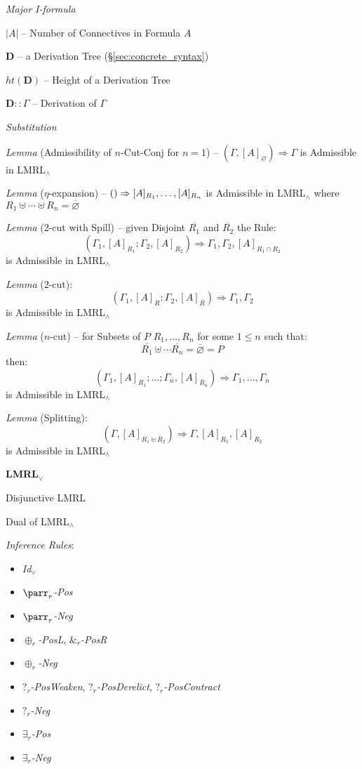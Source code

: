 \emph{Major I-formula} %

$|A|$ -- Number of Connectives in Formula $A$

$\mathbf{D}$ -- a Derivation Tree (\S\ref{sec:concrete_syntax})

$ht(\mathbf{D})$ -- Height of a Derivation Tree

$\mathbf{D} :: \Gamma$ -- Derivation of $\Gamma$

\emph{Substitution} %

\emph{Lemma} (Admissibility of $n$-Cut-Conj for $n = 1$) -- $(\Gamma,
     [A]_\varnothing) \Rightarrow \Gamma$ is Admissible in
     LMRL$_\wedge$

\emph{Lemma} ($\eta$-expansion) -- $\mathsf{()} \Rightarrow [A]_{R_1}, \ldots,
     [A]_{R_n}$ is Admissible in LMRL$_\wedge$ where $R_1 \uplus
     \cdots \uplus R_n = \overline{\varnothing}$

\emph{Lemma} (2-cut with Spill) -- given Disjoint $\overline{R_1}$ and
$\overline{R_2}$ the Rule:
\[
  (\Gamma_1, [A]_{R_1}; \Gamma_2,[A]_{R_2}) \Rightarrow
    \Gamma_1, \Gamma_2, [A]_{R_1 \cap R_2}
\]
is Admissible in LMRL$_\wedge$

\emph{Lemma} (2-cut):
\[
  (\Gamma_1, [A]_R : \Gamma_2, [A]_{\overline{R}})
    \Rightarrow \Gamma_1,\Gamma_2
\]
is Admissible in LMRL$_\wedge$

\emph{Lemma} ($n$-cut) -- for Subsets of $P$ $R_1,\ldots,R_n$ for some
$1 \leq n$ such that:
\[
  \overline{R_1} \uplus \cdots \overline{R_n} = \overline{\varnothing}
    = P
\]
then:
\[
  (\Gamma_1,[A]_{R_1}; \ldots; \Gamma_n,[A]_{R_n})
    \Rightarrow \Gamma_1, \ldots, \Gamma_n
\]
is Admissible in LMRL$_\wedge$

\emph{Lemma} (Splitting):
\[
  (\Gamma,[A]_{R_1 \uplus R_2}) \Rightarrow \Gamma,[A]_{R_1},[A]_{R_2}
\]
is Admissible in LMRL$_\wedge$


\textbf{LMRL$_\vee$}

Disjunctive LMRL

Dual of LMRL$_\wedge$

\emph{Inference Rules}:
\begin{itemize}
  \item \emph{Id$_\vee$}
  \item \emph{$\parr_r$-Pos}
  \item \emph{$\parr_r$-Neg}
  \item \emph{$\oplus_r$-PosL}, \emph{$\&_r$-PosR}
  \item \emph{$\oplus_r$-Neg}
  \item \emph{$?_r$-PosWeaken}, \emph{$?_r$-PosDerelict},
    \emph{$?_r$-PosContract}
  \item \emph{$?_r$-Neg}
  \item \emph{$\exists_r$-Pos}
  \item \emph{$\exists_r$-Neg}
\end{itemize}

